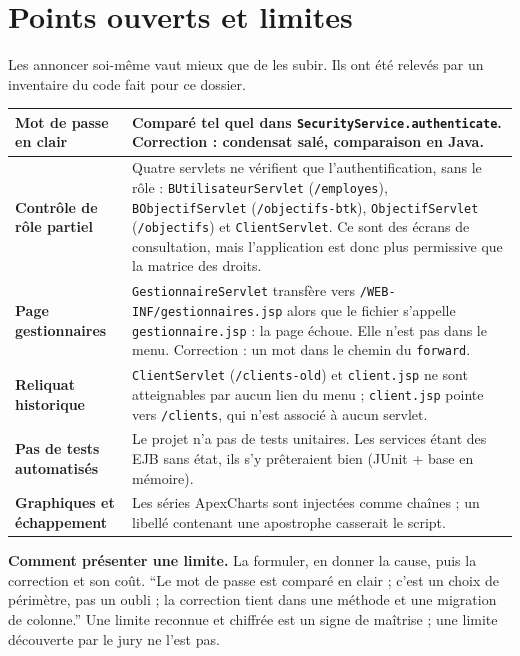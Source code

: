 \section{Points ouverts et limites}

Les annoncer soi-même vaut mieux que de les subir. Ils ont été relevés par un
inventaire du code fait pour ce dossier.

\noindent\begin{tabularx}{\textwidth}{|>{\bfseries}L{3.6cm}|X|}
\hline
Mot de passe en clair & Comparé tel quel dans \texttt{SecurityService.authenticate}. Correction : condensat salé, comparaison en Java.\\
\hline
Contrôle de rôle partiel & Quatre servlets ne vérifient que l'authentification, sans le rôle : \texttt{BUtilisateurServlet} (\texttt{/employes}), \texttt{BObjectifServlet} (\texttt{/objectifs-btk}), \texttt{ObjectifServlet} (\texttt{/objectifs}) et \texttt{ClientServlet}. Ce sont des écrans de consultation, mais l'application est donc plus permissive que la matrice des droits.\\
\hline
Page gestionnaires & \texttt{GestionnaireServlet} transfère vers \texttt{/WEB-INF/gestionnaires.jsp} alors que le fichier s'appelle \texttt{gestionnaire.jsp} : la page échoue. Elle n'est pas dans le menu. Correction : un mot dans le chemin du \texttt{forward}.\\
\hline
Reliquat historique & \texttt{ClientServlet} (\texttt{/clients-old}) et \texttt{client.jsp} ne sont atteignables par aucun lien du menu ; \texttt{client.jsp} pointe vers \texttt{/clients}, qui n'est associé à aucun servlet.\\
\hline
Pas de tests automatisés & Le projet n'a pas de tests unitaires. Les services étant des EJB sans état, ils s'y prêteraient bien (JUnit + base en mémoire).\\
\hline
Graphiques et échappement & Les séries ApexCharts sont injectées comme chaînes ; un libellé contenant une apostrophe casserait le script.\\
\hline
\end{tabularx}

\vspace{0.8em}
\begin{retenir}
\textbf{Comment présenter une limite.} La formuler, en donner la cause, puis
la correction et son coût. \enquote{Le mot de passe est comparé en clair ;
c'est un choix de périmètre, pas un oubli ; la correction tient dans une
méthode et une migration de colonne.} Une limite reconnue et chiffrée est un
signe de maîtrise ; une limite découverte par le jury ne l'est pas.
\end{retenir}

